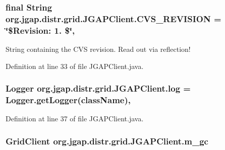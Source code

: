 \hypertarget{classorg_1_1jgap_1_1distr_1_1grid_1_1_j_g_a_p_client_a9b838e5f32f6957978961401a7f40d65}{
\subsubsection[{C\-V\-S\-\_\-\-R\-E\-V\-I\-S\-I\-O\-N}]{\setlength{\rightskip}{0pt plus 5cm}final String org.\-jgap.\-distr.\-grid.\-J\-G\-A\-P\-Client.\-C\-V\-S\-\_\-\-R\-E\-V\-I\-S\-I\-O\-N = \char`\"{}\$Revision\-: 1. \$\char`\"{}\hspace{0.3cm}{\ttfamily [static]}, {\ttfamily [private]}}}\label{classorg_1_1jgap_1_1distr_1_1grid_1_1_j_g_a_p_client_a9b838e5f32f6957978961401a7f40d65}
String containing the C\-V\-S revision. Read out via reflection! 

Definition at line 33 of file J\-G\-A\-P\-Client.\-java.

\hypertarget{classorg_1_1jgap_1_1distr_1_1grid_1_1_j_g_a_p_client_a66c6b3f83748216504b5f9e2cb8fd9d2}{
\subsubsection[{log}]{\setlength{\rightskip}{0pt plus 5cm}Logger org.\-jgap.\-distr.\-grid.\-J\-G\-A\-P\-Client.\-log = Logger.\-get\-Logger({\bf class\-Name})\hspace{0.3cm}{\ttfamily [static]}, {\ttfamily [private]}}}\label{classorg_1_1jgap_1_1distr_1_1grid_1_1_j_g_a_p_client_a66c6b3f83748216504b5f9e2cb8fd9d2}


Definition at line 37 of file J\-G\-A\-P\-Client.\-java.

\hypertarget{classorg_1_1jgap_1_1distr_1_1grid_1_1_j_g_a_p_client_a3941da8ea8f19d5b81115c2d559ff06f}{
\subsubsection[{m\-\_\-gc}]{\setlength{\rightskip}{0pt plus 5cm}Grid\-Client org.\-jgap.\-distr.\-grid.\-J\-G\-A\-P\-Client.\-m\-\_\-gc\hspace{0.3cm}{\ttfamily [private]}}}\label{classorg_1_1jgap_1_1distr_1_1grid_1_1_j_g_a_p_client_a3941da8ea8f19d5b81115c2d559ff06f}


